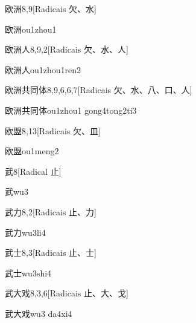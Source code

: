 \begin{entry}{欧洲}{8,9}[Radicais ⽋、⽔]
  \begin{phonetics}{欧洲}{ou1zhou1}
  \end{phonetics}
\end{entry}

\begin{entry}{欧洲人}{8,9,2}[Radicais ⽋、⽔、⼈]
  \begin{phonetics}{欧洲人}{ou1zhou1ren2}
  \end{phonetics}
\end{entry}

\begin{entry}{欧洲共同体}{8,9,6,6,7}[Radicais ⽋、⽔、⼋、⼝、⼈]
  \begin{phonetics}{欧洲共同体}{ou1zhou1 gong4tong2ti3}
  \end{phonetics}
\end{entry}

\begin{entry}{欧盟}{8,13}[Radicais ⽋、⽫]
  \begin{phonetics}{欧盟}{ou1meng2}
  \end{phonetics}
\end{entry}

\begin{entry}{武}{8}[Radical ⽌]
  \begin{phonetics}{武}{wu3}
  \end{phonetics}
\end{entry}

\begin{entry}{武力}{8,2}[Radicais ⽌、⼒]
  \begin{phonetics}{武力}{wu3li4}
  \end{phonetics}
\end{entry}

\begin{entry}{武士}{8,3}[Radicais ⽌、⼠]
  \begin{phonetics}{武士}{wu3shi4}
  \end{phonetics}
\end{entry}

\begin{entry}{武大戏}{8,3,6}[Radicais ⽌、⼤、⼽]
  \begin{phonetics}{武大戏}{wu3 da4xi4}
  \end{phonetics}
\end{entry}

